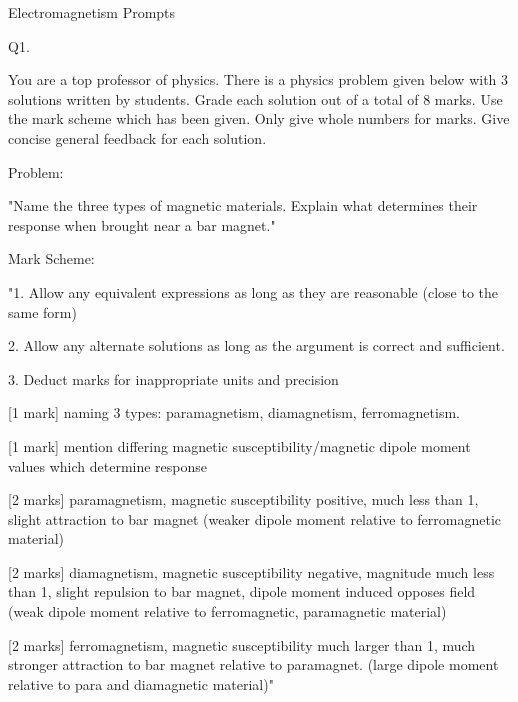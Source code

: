 



Electromagnetism Prompts

                           Q1. 

You are a top professor of physics. There is a physics problem given below with 3 solutions written by students. Grade each solution out of a total of 8 marks. Use the mark scheme which has been given.  Only give whole numbers for marks. Give concise general feedback for each solution. 

Problem: 

"Name the three types of magnetic materials. Explain what determines their response when brought near a bar magnet."

Mark Scheme:

"1. Allow any equivalent expressions as long as they are reasonable (close to the same form)

2. Allow any alternate solutions as long as the argument is correct and sufficient. 

3. Deduct marks for inappropriate units and precision

[1 mark] naming 3 types: paramagnetism, diamagnetism, ferromagnetism. 

[1 mark] mention differing magnetic susceptibility/magnetic dipole moment values which determine response 

[2 marks] paramagnetism, magnetic susceptibility positive, much less than 1, slight attraction to bar magnet (weaker dipole moment relative to ferromagnetic material)

[2 marks] diamagnetism, magnetic susceptibility negative, magnitude much less than 1, slight repulsion to bar magnet, dipole moment induced opposes field (weak dipole moment relative to ferromagnetic, paramagnetic material)

[2 marks] ferromagnetism, magnetic susceptibility much larger than 1, much stronger attraction to bar magnet relative to paramagnet. (large dipole moment relative to para and diamagnetic material)"

